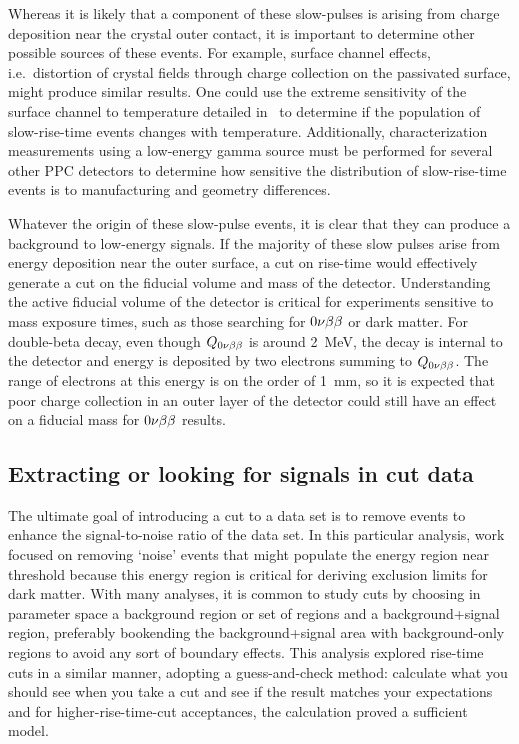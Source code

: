 Whereas it is likely that a component of these slow-pulses is arising from charge deposition near the crystal outer contact, it is important to determine other possible sources of these events.  For example, surface channel effects, i.e.~distortion of crystal fields through charge collection on the passivated surface, might produce similar results.  One could use the extreme sensitivity of the surface channel to temperature detailed in~\cite{Hull1995488} to determine if the population of slow-rise-time events changes with temperature.  Additionally, characterization measurements using a low-energy gamma source must be performed for several other PPC detectors to determine how sensitive the distribution of slow-rise-time events is to manufacturing and geometry differences.  

Whatever the origin of these slow-pulse events, it is clear that they can produce a background to low-energy signals.  If the majority of these slow pulses arise from energy deposition near the outer surface, a cut on rise-time would effectively generate a cut on the fiducial volume and mass of the detector.  Understanding the active fiducial volume of the detector is critical for experiments sensitive to mass exposure times, such as those searching for $0 \nu \beta \beta$ or dark matter.  For double-beta decay, even though $Q_{0 \nu \beta \beta}$ is around 2~MeV, the decay is internal to the detector and energy is deposited by two electrons summing to $Q_{0 \nu \beta \beta}$.  The range of electrons at this energy is on the order of 1~mm, so it is expected that poor charge collection in an outer layer of the detector could still have an effect on a fiducial mass for $0 \nu \beta \beta$ results.  


	\subsection{Extracting or looking for signals in cut data}
	\label{sec:BeGeLowEnergyFeatures}
	
	The ultimate goal of introducing a cut to a data set is to remove events to enhance the signal-to-noise ratio of the data set.  In this particular analysis, work focused on removing `noise' events that might populate the energy region near threshold because this energy region is critical for deriving exclusion limits for dark matter.  With many analyses, it is common to study cuts by choosing in parameter space a background region or set of regions and a background+signal region, preferably bookending the background+signal area with background-only regions to avoid any sort of boundary effects.   This analysis explored rise-time cuts in a similar manner, adopting a guess-and-check method: calculate what you should see when you take a cut and see if the result matches your expectations and for higher-rise-time-cut acceptances, the calculation proved a sufficient model.  
	
